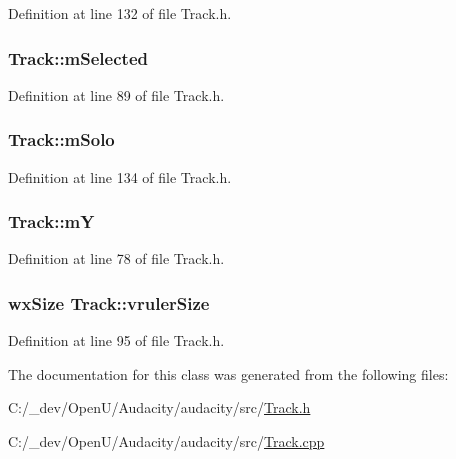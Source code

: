 Definition at line 132 of file Track.\+h.

\subsubsection[{\texorpdfstring{m\+Selected}{mSelected}}]{ Track\+::m\+Selected\hspace{0.3cm}{\ttfamily [protected]}}\hypertarget{class_track_a673c205a3e39989f31d2e2e9d6addb5a}{}\label{class_track_a673c205a3e39989f31d2e2e9d6addb5a}


Definition at line 89 of file Track.\+h.

\subsubsection[{\texorpdfstring{m\+Solo}{mSolo}}]{ Track\+::m\+Solo\hspace{0.3cm}{\ttfamily [protected]}}\hypertarget{class_track_ab21eed7b5982622ba28451c5f76d3156}{}\label{class_track_ab21eed7b5982622ba28451c5f76d3156}


Definition at line 134 of file Track.\+h.

\subsubsection[{\texorpdfstring{mY}{mY}}]{ Track\+::mY\hspace{0.3cm}{\ttfamily [protected]}}\hypertarget{class_track_a2735771116264155d95db58912964a52}{}\label{class_track_a2735771116264155d95db58912964a52}


Definition at line 78 of file Track.\+h.

\subsubsection[{\texorpdfstring{vruler\+Size}{vrulerSize}}]{\setlength{\rightskip}{0pt plus 5cm}wx\+Size Track\+::vruler\+Size\hspace{0.3cm}{\ttfamily [mutable]}}\hypertarget{class_track_a798c2a7bb95cde4d9873f09aa08645bd}{}\label{class_track_a798c2a7bb95cde4d9873f09aa08645bd}


Definition at line 95 of file Track.\+h.



The documentation for this class was generated from the following files\+:\begin{DoxyCompactItemize}
\item 
C\+:/\+\_\+dev/\+Open\+U/\+Audacity/audacity/src/\hyperlink{src_2track_8h}{Track.\+h}\item 
C\+:/\+\_\+dev/\+Open\+U/\+Audacity/audacity/src/\hyperlink{src_2track_8cpp}{Track.\+cpp}\end{DoxyCompactItemize}
